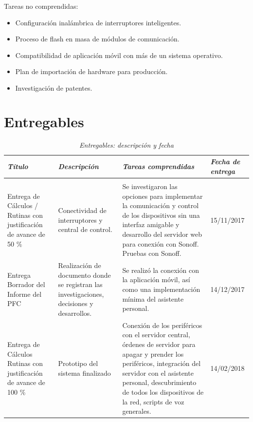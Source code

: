 Tareas no comprendidas:

\begin{itemize}

\item Configuración inalámbrica de interruptores inteligentes.

\item Proceso de flash en masa de módulos de comunicación.

\item Compatibilidad de aplicación móvil con más de un sistema operativo.

\item Plan de importación de hardware para producción.

\item Investigación de patentes.

\end{itemize}

\section{Entregables}
\begin{table}[H]
\begin{tabular}{p{}p{}p{}p{}}
\toprule 
\textit{Título} & \textit{Descripción} & \textit{Tareas comprendidas} & \textit{Fecha de entrega} \\
\midrule \\
\rowcolor{green!5} Entrega de Cálculos / Rutinas con justificación de avance de 50 \% & Conectividad de interruptores y central de control. & Se investigaron las opciones para implementar la comunicación y control de los dispositivos sin una interfaz amigable y desarrollo del servidor web para conexión con Sonoff. Pruebas con Sonoff. & 15/11/2017 \\
Entrega Borrador del Informe del PFC & Realización de documento donde se registran las investigaciones, decisiones y desarrollos.
 & Se realizó la conexión con la aplicación móvil, así como una implementación mínima del asistente personal. & 14/12/2017 \\
\rowcolor{green!5} Entrega de Cálculos \/ Rutinas con justificación de avance de 100 \% & Prototipo del sistema finalizado & Conexión de los periféricos con el servidor central, órdenes de servidor para apagar y prender los periféricos, integración del servidor con el asistente personal, descubrimiento de todos los dispositivos de la red, scripts de voz generales. & 14/02/2018 \\
\bottomrule
\end{tabular}
 \caption{\textit{Entregables: descripción y fecha}}
\end{table}

